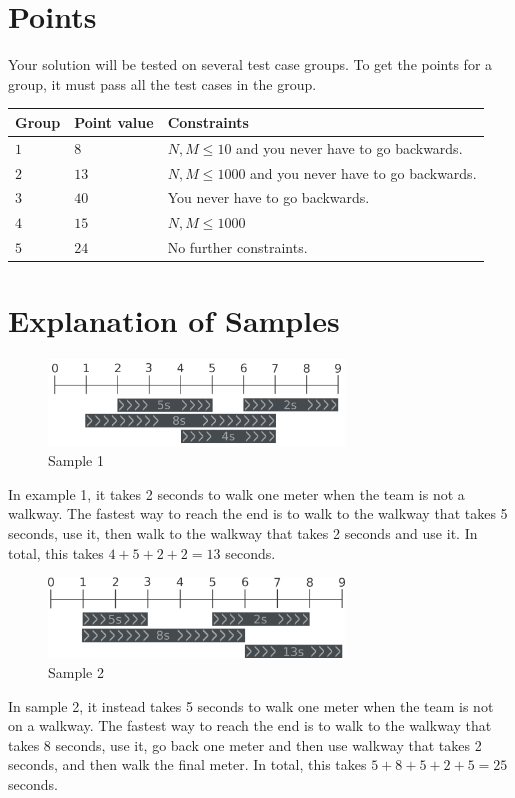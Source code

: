 \section*{Points}
Your solution will be tested on several test case groups.
To get the points for a group, it must pass all the test cases in the group.

\noindent
\begin{tabular}{| l | l | p{12cm} |}
  \hline
  \textbf{Group} & \textbf{Point value} & \textbf{Constraints} \\ \hline
  $1$   & $8$      & $N,M \le 10$ and you never have to go backwards. \\ \hline
  $2$   & $13$     & $N,M \le 1000$ and you never have to go backwards. \\ \hline
  $3$   & $40$     & You never have to go backwards. \\ \hline
  $4$   & $15$     & $N,M \le 1000$ \\ \hline
  $5$   & $24$     & No further constraints. \\ \hline
\end{tabular}


\section*{Explanation of Samples}

\begin{figure}[h]
	\centering
\includegraphics[width=0.7\textwidth]{sample1}
\caption{Sample 1}
\end{figure}
In example 1, it takes 2 seconds to walk one meter when the team is not a walkway.
The fastest way to reach the end is to walk to the walkway that takes 5 seconds, use it,
then walk to the walkway that takes 2 seconds and use it.
In total, this takes $4+5+2+2=13$ seconds.




\begin{figure}[h]
	\centering
\includegraphics[width=0.7\textwidth]{sample2}
\caption{Sample 2}
\end{figure}
In sample 2, it instead takes 5 seconds to walk one meter when the team is not on a walkway.
The fastest way to reach the end is to walk to the walkway that takes 8 seconds, use it, go back
one meter and then use walkway that takes 2 seconds, and then walk the final meter.
In total, this takes $5+8+5+2+5=25$ seconds.


